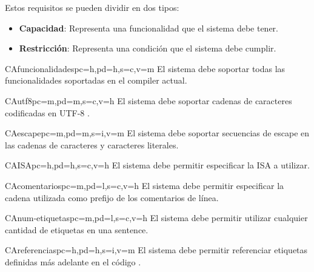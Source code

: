\noindent
Estos requisitos se pueden dividir en dos tipos:

\begin{itemize}
    \item \textbf{Capacidad}: Representa una funcionalidad que el sistema debe tener.
    \item \textbf{Restricción}: Representa una condición que el sistema debe cumplir.
\end{itemize}

\printureqtemplate


\begin{userReq}{CA}{funcionalidades}{pc=h,pd=h,s=c,v=m}
    El sistema debe soportar todas las funcionalidades soportadas en el
    \gls{compiler} actual.
\end{userReq}

\begin{userReq}{CA}{utf8}{pc=m,pd=m,s=c,v=h}
    El sistema debe soportar cadenas de caracteres codificadas en UTF-8
    \parencite{UTF-8}.
\end{userReq}

\begin{userReq}{CA}{escape}{pc=m,pd=m,s=i,v=m}
    El sistema debe soportar secuencias de escape en las cadenas de caracteres y
    caracteres literales.
\end{userReq}

\begin{userReq}{CA}{ISA}{pc=h,pd=h,s=c,v=h}
    El sistema debe permitir especificar la \gls{ISA} a utilizar.
\end{userReq}

\begin{userReq}{CA}{comentarios}{pc=m,pd=l,s=c,v=h}
    El sistema debe permitir especificar la cadena utilizada como prefijo de los
    comentarios de línea.
\end{userReq}

\begin{userReq}{CA}{num-etiquetas}{pc=m,pd=l,s=c,v=h}
    El sistema debe permitir utilizar cualquier cantidad de etiquetas en una
    \gls{sentence}.
\end{userReq}

\begin{userReq}{CA}{referencias}{pc=h,pd=h,s=i,v=m}
    El sistema debe permitir referenciar etiquetas definidas más adelante en el
    código .
\end{userReq}

